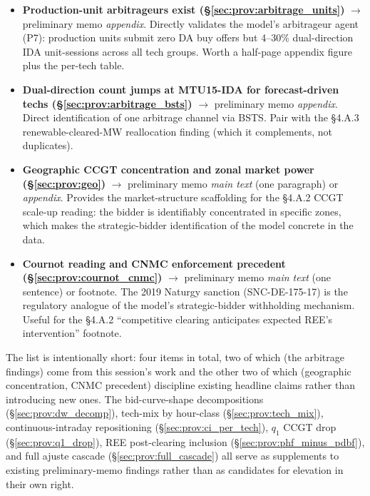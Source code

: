 \documentclass[11pt,a4paper]{article}
\begin{document}
\begin{itemize}\setlength{\itemsep}{4pt}
\item \textbf{Production-unit arbitrageurs exist (§\ref{sec:prov:arbitrage_units})} $\to$ preliminary memo \emph{appendix}. Directly validates the model's arbitrageur agent (P7): production units submit zero DA buy offers but 4--30\% dual-direction IDA unit-sessions across all tech groups. Worth a half-page appendix figure plus the per-tech table.
\item \textbf{Dual-direction count jumps at MTU15-IDA for forecast-driven techs (§\ref{sec:prov:arbitrage_bsts})} $\to$ preliminary memo \emph{appendix}. Direct identification of one arbitrage channel via BSTS. Pair with the §4.A.3 renewable-cleared-MW reallocation finding (which it complements, not duplicates).
\item \textbf{Geographic CCGT concentration and zonal market power (§\ref{sec:prov:geo})} $\to$ preliminary memo \emph{main text} (one paragraph) or \emph{appendix}. Provides the market-structure scaffolding for the §4.A.2 CCGT scale-up reading: the bidder is identifiably concentrated in specific zones, which makes the strategic-bidder identification of the model concrete in the data.
\item \textbf{Cournot reading and CNMC enforcement precedent (§\ref{sec:prov:cournot_cnmc})} $\to$ preliminary memo \emph{main text} (one sentence) or footnote. The 2019 Naturgy sanction (SNC-DE-175-17) is the regulatory analogue of the model's strategic-bidder withholding mechanism. Useful for the §4.A.2 ``competitive clearing anticipates expected REE's intervention'' footnote.
\end{itemize}

\noindent The list is intentionally short: four items in total, two of which (the arbitrage findings) come from this session's work and the other two of which (geographic concentration, CNMC precedent) discipline existing headline claims rather than introducing new ones. The bid-curve-shape decompositions (§\ref{sec:prov:dw_decomp}), tech-mix by hour-class (§\ref{sec:prov:tech_mix}), continuous-intraday repositioning (§\ref{sec:prov:ci_per_tech}), $q_1$ CCGT drop (§\ref{sec:prov:q1_drop}), REE post-clearing inclusion (§\ref{sec:prov:phf_minus_pdbf}), and full ajuste cascade (§\ref{sec:prov:full_cascade}) all serve as supplements to existing preliminary-memo findings rather than as candidates for elevation in their own right.
\end{document}
